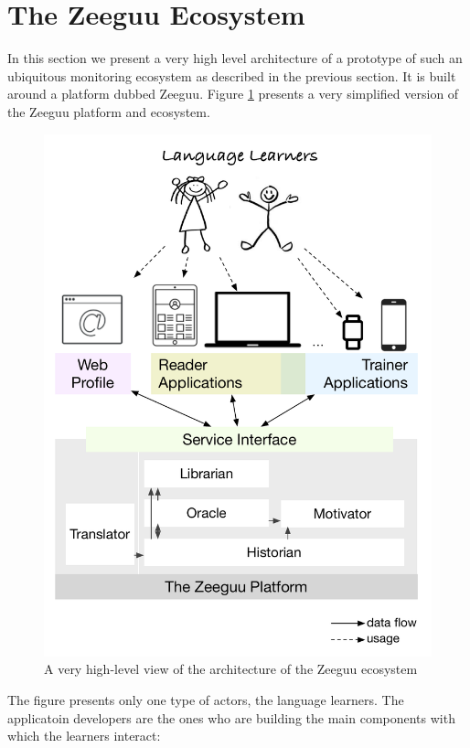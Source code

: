 

\section {The Zeeguu Ecosystem}
In this section we present a very high level architecture of a prototype of such an ubiquitous monitoring ecosystem as described in the previous section. It is built around a platform dubbed Zeeguu. Figure \ref{fig:architecture} presents a very simplified version of the Zeeguu platform and ecosystem.

\begin{figure}[h!]
	\includegraphics[width=0.98\linewidth]{images/zeeguu-architecture.pdf}
	\caption{A very high-level view of the architecture of the Zeeguu ecosystem}
	\label{fig:architecture}
\end{figure}

The figure presents only one type of actors, the language learners. The applicatoin developers are the ones who are building the main components with which the learners interact: 


